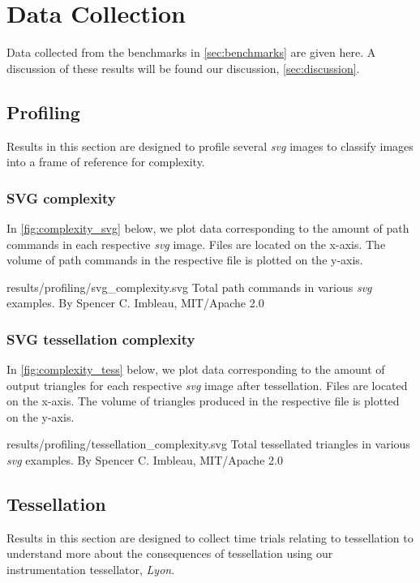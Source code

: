 \section{Data Collection}
Data collected from the benchmarks in \cref{sec:benchmarks} are given here. A discussion of these results will be found our discussion, \cref{sec:discussion}.

\subsection{Profiling}\label{sec:results_profiling}
Results in this section are designed to profile several \textit{svg} images to classify images into a frame of reference for complexity.

\subsubsection{SVG complexity}
In \cref{fig:complexity_svg} below, we plot data corresponding to the amount of path commands in each respective \textit{svg} image. Files are located on the x-axis. The volume of path commands in the respective file is plotted on the y-axis.\medskip

\widesvg
{results/profiling/svg_complexity.svg}
{Total path commands in various \textit{svg} examples.\label{fig:complexity_svg}}
{By Spencer C. Imbleau, MIT/Apache 2.0}\medskip

\subsubsection{SVG tessellation complexity}
In \cref{fig:complexity_tess} below, we plot data corresponding to the amount of output triangles for each respective \textit{svg} image after tessellation. Files are located on the x-axis. The volume of triangles produced in the respective file is plotted on the y-axis.\medskip

\widesvg
{results/profiling/tessellation_complexity.svg}
{Total tessellated triangles in various \textit{svg} examples.\label{fig:complexity_tess}}
{By Spencer C. Imbleau, MIT/Apache 2.0}


\subsection{Tessellation}\label{sec:results_tessellation}
Results in this section are designed to collect time trials relating to tessellation to understand more about the consequences of tessellation using our instrumentation tessellator, \textit{Lyon}.

